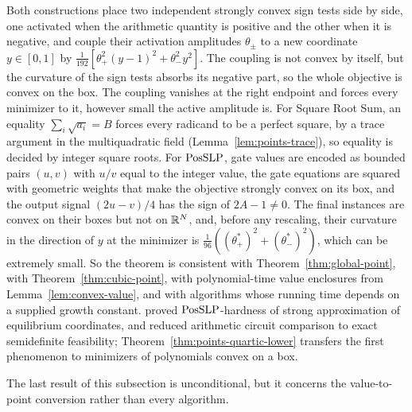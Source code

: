 Both constructions place two independent strongly convex sign tests side by
side, one activated when the arithmetic quantity is positive and the other
when it is negative, and couple their activation amplitudes $\theta_\pm$ to a
new coordinate $y\in[0,1]$ by
$\frac1{192}[\theta_+^2(y-1)^2+\theta_-^2y^2]$. The coupling is not convex by
itself, but the curvature of the sign tests absorbs its negative part, so the
whole objective is convex on the box. The coupling vanishes at the right
endpoint and forces every minimizer to it, however small the active
amplitude is. For Square Root Sum, an equality
$\sum_i\sqrt{a_i}=B$ forces every radicand to be a perfect square, by a trace
argument in the multiquadratic field (Lemma~\ref{lem:points-trace}), so
equality is decided by integer square roots. For $\mathrm{PosSLP}$, gate values are
encoded as bounded pairs $(u,v)$ with $u/v$ equal to the integer value, the
gate equations are squared with geometric weights that make the objective
strongly convex on its box, and the output signal $(2u-v)/4$ has the sign of
$2A-1\ne0$. The final instances are convex on their boxes but not on
$\mathbb R^N$, and, before any rescaling, their curvature in the direction of $y$ at
the minimizer is $\frac1{96}((\theta_+^*)^2+(\theta_-^*)^2)$, which can be
extremely small. So
the theorem is consistent with Theorem~\ref{thm:global-point}, with
Theorem~\ref{thm:cubic-point}, with polynomial-time value enclosures from
Lemma~\ref{lem:convex-value}, and with algorithms whose running time depends
on a supplied growth constant. \citet{EY2010} proved $\mathrm{PosSLP}$-hardness of
strong approximation of equilibrium coordinates, and \citet{TarasovVyalyi2008}
reduced arithmetic circuit comparison to exact semidefinite feasibility;
Theorem~\ref{thm:points-quartic-lower} transfers the first phenomenon to
minimizers of polynomials convex on a box.

The last result of this subsection is unconditional, but it concerns the
value-to-point conversion rather than every algorithm.

